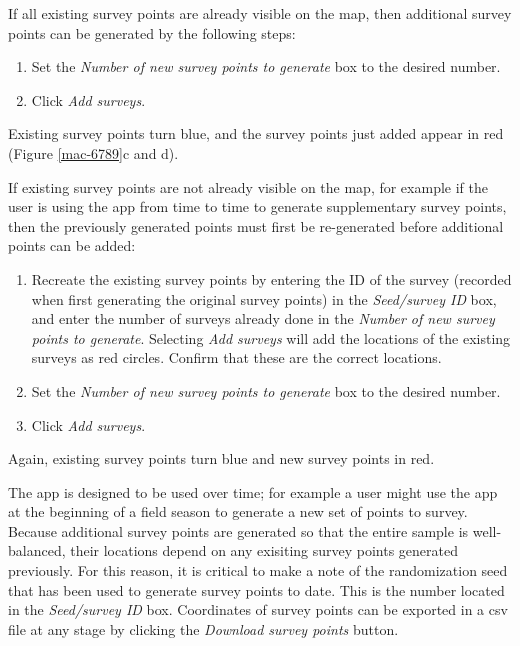 \documentclass[a4paper,11pt, draft]{article} %
\begin{document}

If all existing survey points are already visible on the map, then additional survey points can be generated by the following steps:
\begin{enumerate}
\item Set the \textit{Number of new survey points to generate} box to the desired number.
\item Click \textit{Add surveys}. 
\end{enumerate}
Existing survey points turn blue, and the survey points just added appear in red  (Figure \ref{mac-6789}c and d).

If existing survey points are not already visible on the map, for example if the user is using the app from time to time to generate supplementary survey points, then the previously generated points must first be re-generated before additional points can be added:
\begin{enumerate}
\item Recreate the existing survey points by entering the ID of the survey (recorded when first generating the original survey points) in the \textit{Seed/survey ID} box, and enter the number of surveys already done in the \textit{Number of new survey points to generate}. Selecting \textit{Add surveys} will add the locations of the existing surveys as red circles. Confirm that these are the correct locations.
\item Set the \textit{Number of new survey points to generate} box to the desired number.
\item Click \textit{Add surveys}. 
\end{enumerate}
Again, existing survey points turn blue and new survey points in red.

The app is designed to be used over time; for example a user might use the app at the beginning of a field season to generate a new set of points to survey. Because additional survey points are generated so that the entire sample is well-balanced, their locations depend on any exisiting survey points generated previously. For this reason, it is critical to make a note of the randomization seed that has been used to generate survey points to date. This is the number located in the \textit{Seed/survey ID} box. Coordinates of survey points can be exported in a csv file at any stage by clicking the \textit{Download survey points} button.



  
\end{document}
